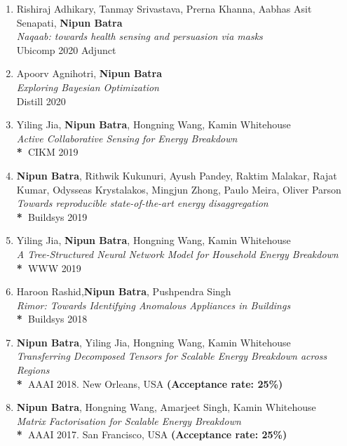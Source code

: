 \documentclass[letter,10pt]{article}
\begin{document}
\begin{itemize}
\begin{enumerate}
    \item{Rishiraj Adhikary, Tanmay Srivastava, Prerna Khanna, Aabhas Asit Senapati, \textbf{Nipun Batra}}\\
    \textit{Naqaab: towards health sensing and persuasion via masks}\\
    {Ubicomp 2020 Adjunct}
    
    \item{Apoorv Agnihotri, \textbf{Nipun Batra}}\\
    \textit{Exploring Bayesian Optimization}\\
    \textbf{}{Distill 2020}

    \item{Yiling Jia, \textbf{Nipun Batra}, Hongning Wang, Kamin Whitehouse}\\
    \textit{Active Collaborative Sensing for Energy Breakdown}\\
    \textbf{*~}{CIKM 2019}
     
    \item{\textbf{Nipun Batra}, Rithwik Kukunuri, Ayush Pandey, Raktim Malakar, Rajat Kumar, Odysseas Krystalakos, Mingjun Zhong, Paulo Meira, Oliver Parson}\\
    \textit{Towards reproducible state-of-the-art energy disaggregation}\\
    \textbf{*~}{Buildsys 2019}
     
     
     \item
            {Yiling Jia, \textbf{Nipun Batra}, Hongning Wang, Kamin Whitehouse}\\
         	\textit{A Tree-Structured Neural Network Model for Household Energy Breakdown
}\\
	       \textbf{*~}{WWW 2019}
            \item
            {Haroon Rashid,\textbf{Nipun Batra}, Pushpendra Singh}\\
         	\textit{Rimor: Towards Identifying Anomalous Appliances in Buildings}\\
	       \textbf{*~}{Buildsys 2018}
        \item
            {\textbf{Nipun Batra}, Yiling Jia, Hongning Wang, Kamin Whitehouse}\\
         	\textit{Transferring Decomposed Tensors for Scalable Energy Breakdown across Regions}\\
	       \textbf{*~}{AAAI 2018. New Orleans, USA \textbf{(Acceptance rate: 25\%)}}
	   \item 
	   	{\textbf{Nipun Batra}, Hongning Wang, Amarjeet Singh, Kamin Whitehouse} \\\textit{Matrix Factorisation for Scalable Energy Breakdown}\\
	 \textbf{*~}{AAAI 2017. San Francisco, USA \textbf{(Acceptance rate: 25\%)}}


\end{enumerate}
\end{itemize}
\end{document}
